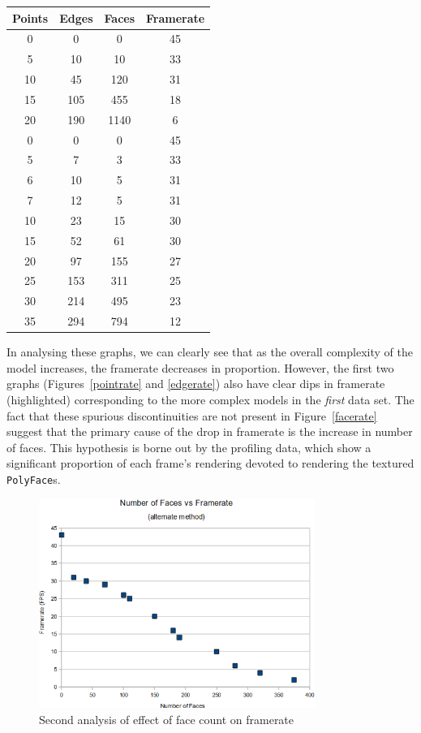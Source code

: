 \documentclass[a4paper,10pt]{article}
\begin{document}
\begin{center}
\begin{tabular}{| c | c | c || c |} 
\hline
\textbf{Points}	& \textbf{Edges}	& \textbf{Faces}	& \textbf{Framerate} \\
\hline
\hline
0	& 0	& 0	& 45 \\
5	& 10	& 10	& 33 \\
10	& 45	& 120	& 31 \\
15	& 105	& 455	& 18 \\
20	& 190	& 1140	& 6 \\
\hline
\hline
0	& 0		& 0		& 45 \\
5	& 7		& 3		& 33 \\
6	& 10	& 5		& 31 \\
7	& 12	& 5		& 31 \\
10	& 23	& 15	& 30 \\
15	& 52	& 61	& 30 \\
20	& 97	& 155	& 27 \\
25	& 153	& 311	& 25 \\
30	& 214	& 495	& 23 \\
35	& 294	& 794	& 12 \\
\hline
\end{tabular}
\end{center} 

In analysing these graphs, we can clearly see that as the overall complexity of the model increases, the framerate decreases in proportion. However, the first two graphs (Figures~\ref{pointrate} and \ref{edgerate}) also have clear dips in framerate (highlighted) corresponding to the more complex models in the \textit{first} data set. The fact that these spurious discontinuities are not present in Figure~\ref{facerate} suggest that the primary cause of the drop in framerate is the increase in number of faces. This hypothesis is borne out by the profiling data, which show a significant proportion of each frame's rendering devoted to rendering the textured \texttt{PolyFace}s.

\begin{figure}
  \begin{center}
    \includegraphics[width=340px]{FacesVsFramerate2}
  \end{center}
  \caption{Second analysis of effect of face count on framerate}
  \label{facesrate2}
\end{figure}
\end{document}
